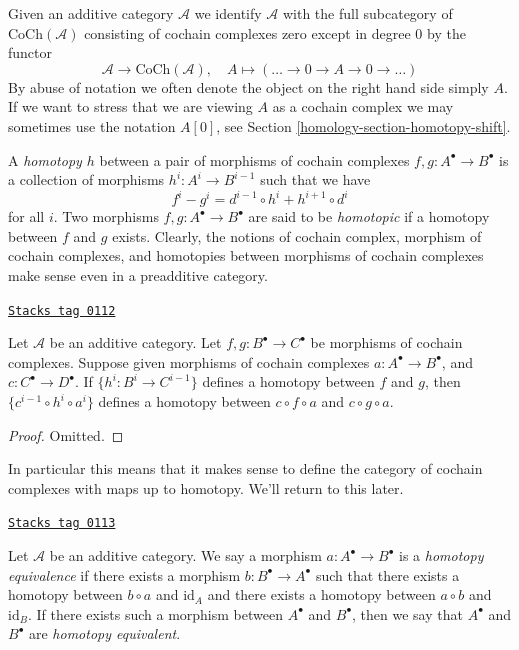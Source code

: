\medskip\noindent
Given an additive category $\mathcal{A}$ we identify $\mathcal{A}$
with the full subcategory of $\text{CoCh}(\mathcal{A})$ consisting
of cochain complexes zero except in degree $0$ by the functor
$$
\mathcal{A} \longrightarrow \text{CoCh}(\mathcal{A}),\quad
A \longmapsto (\ldots \to 0 \to A \to 0 \to \ldots)
$$
By abuse of notation we often denote the object on the right hand side
simply $A$. If we want to stress that we are viewing $A$ as a cochain
complex we may sometimes use the notation $A[0]$, see
Section \ref{homology-section-homotopy-shift}.

\medskip\noindent
A {\it homotopy $h$} between a pair of morphisms
of cochain complexes $f, g : A^\bullet \to B^\bullet$
is a collection of morphisms $h^i : A^i \to B^{i - 1}$
such that we have
$$
f^i - g^i = d^{i - 1} \circ h^i + h^{i + 1} \circ d^i
$$
for all $i$.
Two morphisms $f, g : A^\bullet \to B^\bullet$ are
said to be {\it homotopic} if a homotopy between $f$
and $g$ exists.
Clearly, the notions of cochain complex, morphism of
cochain complexes, and homotopies between morphisms of cochain complexes
make sense even in a preadditive category.

\begin{lemma}
\label{homology-lemma-compose-homotopy-cochain}
\href{https://stacks.math.columbia.edu/tag/0112}{\texttt{Stacks tag 0112}}

Let $\mathcal{A}$ be an additive category.
Let $f, g : B^\bullet \to C^\bullet$ be morphisms
of cochain complexes. Suppose given morphisms of cochain
complexes $a : A^\bullet \to B^\bullet$, and
$c : C^\bullet \to D^\bullet$.
If $\{h^i : B^i \to C^{i - 1}\}$ defines a homotopy
between $f$ and $g$, then $\{c^{i - 1} \circ h^i \circ a^i\}$
defines a homotopy between $c \circ f \circ a$ and
$c \circ g \circ a$.
\end{lemma}

\begin{proof}
Omitted.
\end{proof}

In particular this means that it makes sense to define
the category of cochain complexes with maps up to homotopy.
We'll return to this later.

\begin{definition}
\label{homology-definition-homotopy-equivalent-cochain}
\href{https://stacks.math.columbia.edu/tag/0113}{\texttt{Stacks tag 0113}}

Let $\mathcal{A}$ be an additive category.
We say a morphism $a : A^\bullet \to B^\bullet$
is a {\it homotopy equivalence} if there exists
a morphism $b : B^\bullet \to A^\bullet$
such that there exists a homotopy between
$b \circ a$ and $\text{id}_A$
and there exists a homotopy between $a \circ b$ and $\text{id}_B$.
If there exists such a morphism between $A^\bullet$ and $B^\bullet$, then
we say that $A^\bullet$ and $B^\bullet$ are {\it homotopy equivalent}.
\end{definition}

